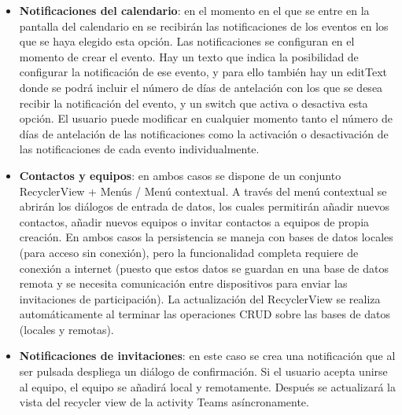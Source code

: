\documentclass[a4paper,openright,12pt]{article}
\begin{document}
\begin{itemize}
    \item \textbf{Notificaciones del calendario}:
    en el momento en el que se entre en la pantalla del calendario en se recibirán las notificaciones de los eventos en los que se haya elegido esta opción. \newline
    Las notificaciones se configuran en el momento de crear el evento. Hay un texto que indica la posibilidad de configurar la notificación de ese evento, y para ello también hay un editText donde se podrá incluir el número de días de antelación con los que se desea recibir la notificación del evento, y un switch que activa o desactiva esta opción. \newline
    El usuario puede modificar en cualquier momento tanto el número de días de antelación de las notificaciones como la activación o desactivación de las notificaciones de cada evento individualmente. 
\end{itemize}
    
\begin{itemize}
    \item \textbf{Contactos y equipos}: en ambos casos se dispone de un conjunto RecyclerView + Menús / Menú contextual. A través del menú contextual se abrirán los diálogos de entrada de datos, los cuales permitirán añadir nuevos contactos, añadir nuevos equipos o invitar contactos a equipos de propia creación. En ambos casos la persistencia se maneja con bases de datos locales (para acceso sin conexión), pero la funcionalidad completa requiere de conexión a internet (puesto que estos datos se guardan en una base de datos remota y se necesita comunicación entre dispositivos para enviar las invitaciones de participación). La actualización del RecyclerView se realiza automáticamente al terminar las operaciones CRUD sobre las bases de datos (locales y remotas).
    \item \textbf{Notificaciones de invitaciones}: en este caso se crea una notificación que al ser pulsada despliega un diálogo de confirmación. Si el usuario acepta unirse al equipo, el equipo se añadirá local y remotamente. Después se actualizará la vista del recycler view de la activity Teams asíncronamente.
\end{itemize}

\end{document}
